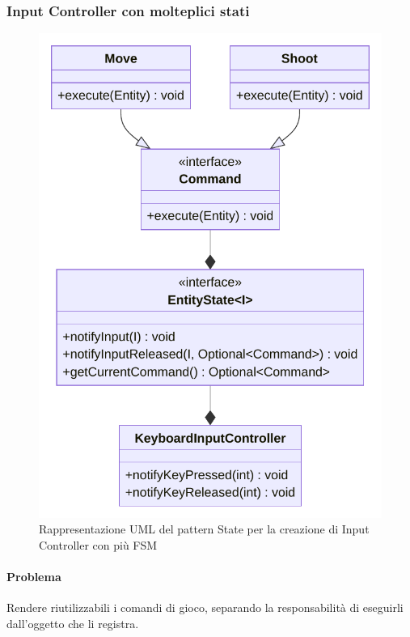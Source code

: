 \documentclass[a4paper,12pt]{report}
\begin{document}
\subsubsection{Input Controller con molteplici stati}

\begin{figure}[H]
\centering{}
\includegraphics[scale=0.75]{img/EntityStateUML}
\caption{Rappresentazione UML del pattern State per la creazione di Input Controller con più FSM}
\label{img:inputControllerStatePattern}
\end{figure}

\paragraph{Problema} Rendere riutilizzabili i comandi di gioco, separando la responsabilità di eseguirli dall’oggetto che li registra.
\end{document}
